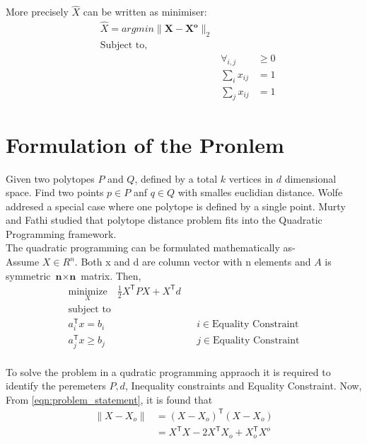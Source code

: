 More precisely $\hat{X}$ can be written as minimiser:
\begin{equation}
\begin{aligned}
& \hat{X} = argmin \parallel \mathbf{X-X^o} \parallel _2\\
& \text{Subject to,}\\
& & \forall _{i,j} &\geq 0 \\
& & \sum_{i} x_{ij}&=1 \\
& & \sum_{j} x_{ij}&=1
\end{aligned}
\label{eqn:problem_statement}
\end{equation}

\section{Formulation of the Pronlem}
Given two polytopes $P$ and $Q$, defined by a total $k$ vertices in $d$ dimensional space. Find two points $p \in P$ anf $q \in Q$ with smalles euclidian distance. Wolfe addresed a special case where one polytope is defined by a single point. Murty and Fathi studied that polytope distance problem fits into the Quadratic Programming framework.\\
The quadratic programming can be formulated mathematically as-\\

Assume $X \in R^n$. Both x and d are column vector with n elements and $A$ is symmetric $\textbf{n} \times \textbf{n} $ matrix. Then,\\

\begin{equation}
\begin{aligned}
\underset{X}{\text{minimize}} \quad \frac{1}{2}X^\mathsf{T} PX+X^\mathsf{T}d\\
\text{subject to} \quad \\
a_i^\mathsf{T}x =b_i & & i\in \textrm{Equality Constraint}\\
a_j^\mathsf{T}x \geq b_j & & j\in \textrm{Equality Constraint}\\
\end{aligned}
\label{eqn:problem_formulation_1}
\end{equation}
 


To solve the problem in a qudratic programming appraoch it is required to identify the peremeters $P,d$, Inequality constraints and Equality Constraint. Now, From \ref{eqn:problem_statement}, it is found that
\begin{equation}
\begin{aligned}
\lVert {X-X_o} \rVert & = (X-X_o)^\mathsf{T}(X-X_o)\\
& = X^\mathsf{T}X-2X^{\mathsf{T}}X_o+X_o^{\mathsf{T}}X^o
\end{aligned}
\label{eqn:problem_formulation_2}
\end{equation}

